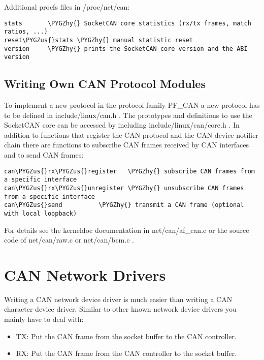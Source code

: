 \documentclass[a4paper,8pt,english]{sphinxmanual}
\def\PYGZus{\char`\_}
\def\PYGZhy{\char`\-}
\begin{document}
Additional procfs files in /proc/net/can:

\begin{Verbatim}[commandchars=\\\{\}]
stats       \PYGZhy{} SocketCAN core statistics (rx/tx frames, match ratios, ...)
reset\PYGZus{}stats \PYGZhy{} manual statistic reset
version     \PYGZhy{} prints the SocketCAN core version and the ABI version
\end{Verbatim}


\subsection{Writing Own CAN Protocol Modules}
\label{networking/can:writing-own-can-protocol-modules}
To implement a new protocol in the protocol family PF\_CAN a new
protocol has to be defined in include/linux/can.h .
The prototypes and definitions to use the SocketCAN core can be
accessed by including include/linux/can/core.h .
In addition to functions that register the CAN protocol and the
CAN device notifier chain there are functions to subscribe CAN
frames received by CAN interfaces and to send CAN frames:

\begin{Verbatim}[commandchars=\\\{\}]
can\PYGZus{}rx\PYGZus{}register   \PYGZhy{} subscribe CAN frames from a specific interface
can\PYGZus{}rx\PYGZus{}unregister \PYGZhy{} unsubscribe CAN frames from a specific interface
can\PYGZus{}send          \PYGZhy{} transmit a CAN frame (optional with local loopback)
\end{Verbatim}

For details see the kerneldoc documentation in net/can/af\_can.c or
the source code of net/can/raw.c or net/can/bcm.c .


\section{CAN Network Drivers}
\label{networking/can:can-network-drivers}
Writing a CAN network device driver is much easier than writing a
CAN character device driver. Similar to other known network device
drivers you mainly have to deal with:
\begin{itemize}
\item {} 
TX: Put the CAN frame from the socket buffer to the CAN controller.

\item {} 
RX: Put the CAN frame from the CAN controller to the socket buffer.

\end{itemize}
\end{document}
